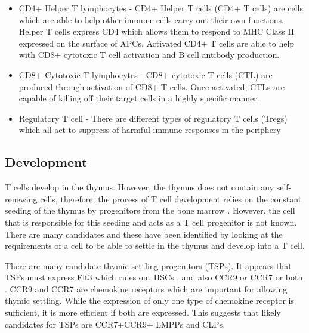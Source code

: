 \begin{itemize}
\item CD4+ Helper T lymphocytes - CD4+ Helper T cells (CD4+ T cells) are cells which are able to help other immune cells carry out their own functions. 
Helper T cells express CD4 which allows them to respond to MHC Class II expressed on the surface of APCs. 
Activated CD4+ T cells are able to help with CD8+ cytotoxic T cell activation and B cell antibody production.
\item CD8+ Cytotoxic T lymphocytes - CD8+ cytotoxic T cells (CTL) are produced through activation of CD8+ T cells.
Once activated, CTLs are capable of killing off their target cells in a highly specific manner.
\item Regulatory T cell - There are different types of regulatory T cells (Tregs) which all act to suppress of harmful immune responses in the periphery
\end{itemize}


\subsection{Development}

T cells develop in the thymus.
However, the thymus does not contain any self-renewing cells, therefore, the process of T cell development relies on the constant seeding of the thymus by progenitors from the bone marrow \citep{Zlotoff2011}.
However, the cell that is responsible for this seeding and acts as a T cell progenitor is not known.
There are many candidates and these have been identified by looking at the requirements of a cell to be able to settle in the thymus and develop into a T cell.

There are many candidate thymic settling progenitors (TSPs).
It appears that TSPs must express Flt3 which rules out HSCs \citep{Zlotoff2011}, and also CCR9 or CCR7 or both \citep{Zlotoff2010}.
CCR9 and CCR7 are chemokine receptors which are important for allowing thymic settling. 
While the expression of only one type of chemokine receptor is sufficient, it is more efficient if both are expressed.
This suggests that likely candidates for TSPs are CCR7+CCR9+ LMPPs and CLPs\citep{Zlotoff2011}.


